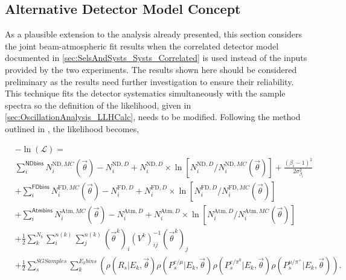\iffalse
\clearpage
\subsection{Alternative Detector Model Concept}
\label{sec:AlternativeDetectorModel}

As a plausible extension to the analysis already presented, this section considers the joint beam-atmospheric fit results when the correlated detector model documented in \autoref{sec:SelsAndSysts_Systs_Correlated} is used instead of the inputs provided by the two experiments. The results shown here should be considered preliminary as the results need further investigation to ensure their reliability. This technique fits the detector systematics simultaneously with the sample spectra so the definition of the likelihood, given in \autoref{sec:OscillationAnalysis_LLHCalc}, needs to be modified. Following the method outlined in , the likelihood becomes,

\begin{equation}
  \label{eqn:Likelihood:Likelihood_CorrelatedDetectorModel}
  \begin{split}
    &-\ln(\mathcal{L}) = \\
    & \sum_{i}^{\mathsf{ND bins}} N_{i}^{\mathrm{ND},MC}(\vec{\theta}) - N_{i}^{\mathrm{ND},D} + N_{i}^{\mathrm{ND},D}  \times \ln \left[ N_{i}^{\mathrm{ND},D}/N_{i}^{\mathrm{ND},MC}(\vec{\theta}) \right] + \frac{(\beta_{i}-1)^{2}}{2\sigma^{2}_{\beta_{i}}} \\
    & +  \sum_{i}^{\mathsf{FD bins}} N_{i}^{\mathrm{FD},MC}(\vec{\theta}) - N_{i}^{\mathrm{FD},D} + N_{i}^{\mathrm{FD},D}  \times \ln \left[ N_{i}^{\mathrm{FD},D}/N_{i}^{\mathrm{FD},MC}(\vec{\theta}) \right] \\
    & +  \sum_{i}^{\mathsf{Atm bins}} N_{i}^{\mathrm{Atm},MC}( \vec{\theta}) - N_{i}^{\mathrm{Atm},D} + N_{i}^{\mathrm{Atm},D} \times  \ln \left[ N_{i}^{\mathrm{Atm},D}/N_{i}^{\mathrm{Atm},MC}(\vec{\theta}) \right] \\
    & + \frac{1}{2} \sum_{k}^{N_{b}} \sum_{i}^{n(k)} \sum_{j}^{n(k)} (\vec{\theta}^{k})_{i} (V^{k})^{-1}_{ij} (\vec{\theta}^{k})_{j} \\
    & + \frac{1}{2} \sum^{SG Samples}_s \sum^{E_{k} bins}_{k} \left(\rho(R_s | E_k, \vec{\theta}) \rho(P^{e/\mu}_s | E_k, \vec{\theta}) \rho(P^{e/\pi^0}_s | E_k, \vec{\theta}) \rho(P^{\mu/\pi^+}_s | E_k, \vec{\theta}) \right).
  \end{split}
\end{equation}

